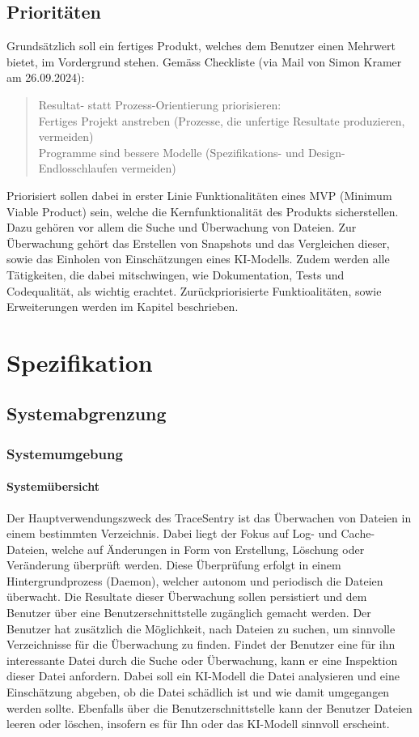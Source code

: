\documentclass[a4paper,12pt]{report}
\begin{document}
    \section{Prioritäten}
    Grundsätzlich soll ein fertiges Produkt, welches dem Benutzer einen Mehrwert bietet, im Vordergrund stehen.
    Gemäss Checkliste (via Mail von Simon Kramer am 26.09.2024):
    \begin{quote}
        Resultat- statt Prozess-Orientierung priorisieren:
        \\Fertiges Projekt anstreben (Prozesse, die unfertige Resultate produzieren, vermeiden)
        \\Programme sind bessere Modelle (Spezifikations- und Design-Endlosschlaufen vermeiden)
    \end{quote}

    Priorisiert sollen dabei in erster Linie Funktionalitäten eines MVP (Minimum Viable Product) sein, welche die Kernfunktionalität des Produkts sicherstellen.
    Dazu gehören vor allem die Suche und Überwachung von Dateien.
    Zur Überwachung gehört das Erstellen von Snapshots und das Vergleichen dieser, sowie das Einholen von Einschätzungen eines KI-Modells.
    Zudem werden alle Tätigkeiten, die dabei mitschwingen, wie Dokumentation, Tests und Codequalität, als wichtig erachtet.
    Zurückpriorisierte Funktioalitäten, sowie Erweiterungen werden im Kapitel  beschrieben.


    \chapter{Spezifikation}
    \section{Systemabgrenzung}
    \subsection{Systemumgebung}
    \subsubsection{Systemübersicht}
    Der Hauptverwendungszweck des TraceSentry ist das Überwachen von Dateien in einem bestimmten Verzeichnis.
    Dabei liegt der Fokus auf Log- und Cache-Dateien, welche auf Änderungen in Form von Erstellung, Löschung oder Veränderung überprüft werden.
    Diese Überprüfung erfolgt in einem Hintergrundprozess (Daemon), welcher autonom und periodisch die Dateien überwacht.
    Die Resultate dieser Überwachung sollen persistiert und dem Benutzer über eine Benutzerschnittstelle zugänglich gemacht werden.
    Der Benutzer hat zusätzlich die Möglichkeit, nach Dateien zu suchen, um sinnvolle Verzeichnisse für die Überwachung zu finden.
    Findet der Benutzer eine für ihn interessante Datei durch die Suche oder Überwachung, kann er eine Inspektion dieser Datei anfordern.
    Dabei soll ein KI-Modell die Datei analysieren und eine Einschätzung abgeben, ob die Datei schädlich ist und wie damit umgegangen werden sollte.
    Ebenfalls über die Benutzerschnittstelle kann der Benutzer Dateien leeren oder löschen, insofern es für Ihn oder das KI-Modell sinnvoll erscheint.
\end{document}

